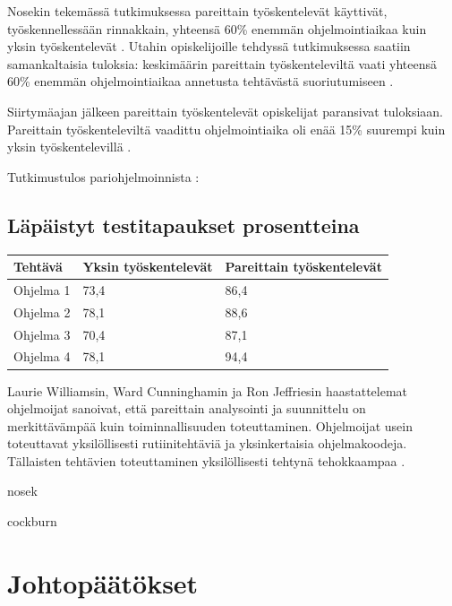 \documentclass[finnish]{tktltiki2}
\theoremstyle{definition}
\theoremstyle{remark}
\begin{document}
Nosekin tekemässä tutkimuksessa pareittain työskentelevät käyttivät, työskennellessään rinnakkain, yhteensä 60\% enemmän ohjelmointiaikaa kuin yksin työskentelevät \cite{NOS98}. Utahin opiskelijoille tehdyssä tutkimuksessa saatiin samankaltaisia tuloksia: keskimäärin pareittain työskenteleviltä vaati yhteensä 60\% enemmän ohjelmointiaikaa annetusta tehtävästä suoriutumiseen \cite{WIL00}.

Siirtymäajan jälkeen pareittain työskentelevät opiskelijat paransivat tuloksiaan. Pareittain työskenteleviltä vaadittu ohjelmointiaika oli enää 15\% suurempi kuin yksin työskentelevillä \cite{WIL00}.

Tutkimustulos pariohjelmoinnista \cite{WIL00}:

\subsection*{Läpäistyt testitapaukset prosentteina}
\begin{center}
    \begin{tabular}{ | l | l | p{5cm} |}
    \hline
    Tehtävä & Yksin työskentelevät & Pareittain työskentelevät \\ \hline
    Ohjelma 1 & 73,4 & 86,4 \\ \hline
    Ohjelma 2 & 78,1 & 88,6 \\ \hline
    Ohjelma 3 & 70,4 & 87,1 \\ \hline
    Ohjelma 4 & 78,1 & 94,4 \\ \hline
    \end{tabular}
\end{center}


Laurie Williamsin, Ward Cunninghamin ja Ron Jeffriesin haastattelemat ohjelmoijat sanoivat, että pareittain analysointi ja suunnittelu on merkittävämpää kuin toiminnallisuuden toteuttaminen. Ohjelmoijat usein toteuttavat yksilöllisesti rutiinitehtäviä ja yksinkertaisia ohjelmakoodeja. Tällaisten tehtävien toteuttaminen yksilöllisesti tehtynä tehokkaampaa \cite{WIL00}.

nosek \cite{NOS98}

cockburn \cite{COC00a}

\section{Johtopäätökset}


%
%
% 
%



\end{document}

